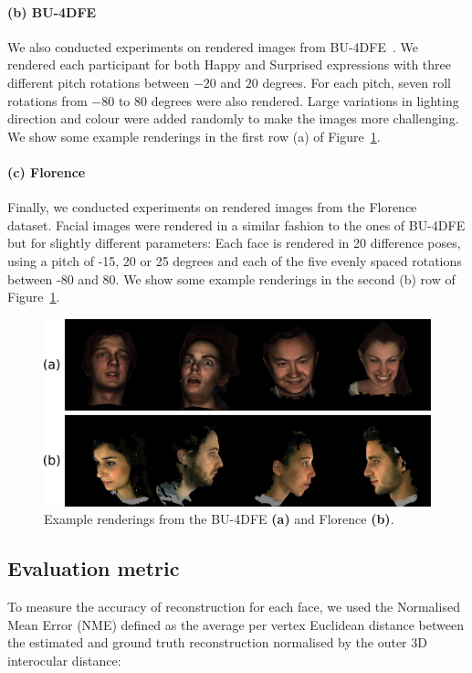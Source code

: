 \paragraph{(b) BU-4DFE} We also conducted experiments on rendered
images from BU-4DFE~\cite{yin2008high}. We rendered each participant
for both Happy and Surprised expressions with three different pitch
rotations between $-20$ and $20$ degrees. For each pitch, seven roll
rotations from $-80$ to $80$ degrees were also rendered. Large
variations in lighting direction and colour were added randomly to
make the images more challenging. We show some example renderings in
the first row (a) of Figure~\ref{fig:example_renderings}.

\paragraph{(c) Florence}
Finally, we conducted experiments on rendered images from the
Florence~\cite{masi2d3dFaceData} dataset. Facial images were rendered
in a similar fashion to the ones of BU-4DFE but for slightly different
parameters: Each face is rendered in 20 difference poses, using a
pitch of -15, 20 or 25 degrees and each of the five evenly spaced
rotations between -80 and 80. We show some example renderings in the
second (b) row of Figure~\ref{fig:example_renderings}.

\begin{figure}
  \centering
  \includegraphics[width=0.9\linewidth]{img/rendering_examples.pdf}
  \caption[Example BU-4DFE and Florence renderings]{Example renderings
    from the BU-4DFE \textbf{(a)} and Florence \textbf{(b)}.}
  \label{fig:example_renderings}
\end{figure}

\subsection{Evaluation metric} To measure the accuracy of reconstruction for
each face, we used the Normalised Mean Error (NME) defined as the
average per vertex Euclidean distance between the estimated and ground
truth reconstruction normalised by the outer 3D interocular distance:

